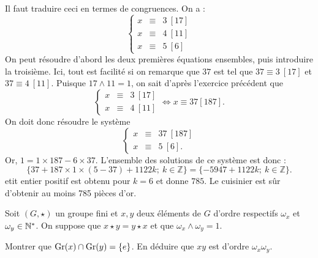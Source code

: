 \documentclass{magnolia}
\begin{document}
\begin{sol}
  Il faut traduire ceci en termes de congruences. On a :
  $$\left\{
  \begin{array}{rcl}
  x&\equiv&3\ [17]\\
  x&\equiv&4\ [11]\\
  x&\equiv&5\ [6]
  \end{array}\right.$$
  On peut résoudre d'abord les deux premières équations
  ensembles, puis introduire la troisième. Ici, tout est facilité si on remarque que $37$ est tel que
  $37\equiv 3\ [17]$ et $37\equiv 4\ [11]$. Puisque $17\wedge 11=1$, on sait d'après l'exercice précédent que
  $$\left\{
  \begin{array}{rcl}
  x&\equiv&3\ [17]\\
  x&\equiv&4\ [11]
  \end{array}\right.
  \iff x\equiv 37[187].$$
  On doit donc résoudre le système
  $$\left\{\begin{array}{rcl}x&\equiv&37\ [187]\\x&\equiv&5\ [6].\end{array}\right.$$
  Or, $1=1\times 187-6\times 37$. L'ensemble des solutions de ce système est donc : $$\{37+187\times1\times (5-37)+1122k;\ k\in\mathbb Z\}=\{-5947+1122k;\ k\in\mathbb Z\}.$$
  etit entier positif est obtenu pour $k=6$ et donne $785$. Le cuisinier est sûr d'obtenir au moins 785 pièces
  d'or.
  \end{sol}

Soit $(G,\star)$ un groupe fini et $x,y$ deux éléments de $G$ d'ordre
respectifs $\omega_x$ et $\omega_y\in{\mathbb{N}^*}$. On suppose que $x\star y=y\star x$
et que $\omega_x\wedge\omega_y=1$.
\begin{questions}
\question Montrer que
${\rm Gr}(x)\cap{\rm Gr}(y)=\left\{e\right\}$.
\question En déduire que  $xy$ est d'ordre $\omega_x\omega_y$.
\end{questions}
\end{document}

